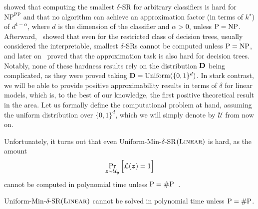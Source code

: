 \citet{Waldchen_MacDonald_Hauch_Kutyniok_2021} showed that computing the smallest $\delta$-SR for arbitrary classifiers is hard for $\textrm{NP}^{\textrm{PP}}$ and that no algorithm can achieve an approximation factor (in terms of $k^\star$) of $d^{1-\alpha}$,  where $d$ is the dimension of the classifier and $\alpha > 0$, unless $\mathrm{P} = \textrm{NP}$. Afterward,~\citet{Arenas_Barcelo_Romero_Subercaseaux_2022} showed that even for the restricted class of decision trees, usually considered the interpretable, smallest $\delta$-SRs cannot be computed unless $\mathrm{P} = \textrm{NP}$, and later on~\citet{Kozachinskiy_2023} proved that the approximation task is also hard for decision trees. Notably, none of these hardness results rely on the distribution $\mathbf{D}$ being complicated, as they were proved taking $\mathbf{D} = \textrm{Uniform}(\{0, 1\}^d)$. 
In stark contrast, we will be able to provide positive approximability results in terms of $\delta$ for linear models, which is, to the best of our knowledge, the first positive theoretical result in the area.
Let us formally define the computational problem at hand, assuming the uniform distribution over $\{0, 1\}^d$, which we will simply denote by $\mathcal{U}$ from now on.



 
Unfortunately, it turns out that even Uniform-Min-$\delta$-SR$(\textsc{Linear})$ is hard, as the amount
\[
    \Pr_{{\bm{z}} \sim  \mathcal{U}_{\bm{y}}}\Big[\mathcal{L}({\bm{z}}) = 1\Big]
\]
cannot be computed in polynomial time unless $\mathrm{P}=\# \mathrm{P}$~\cite{NEURIPS2020_b1adda14}. 

\begin{proposition}\label{prop:hardness}
    Uniform-Min-$\delta$-SR$(\textsc{Linear})$ cannot be solved in polynomial time unless $\mathrm{P} = \# \mathrm{P}$.
\end{proposition}


